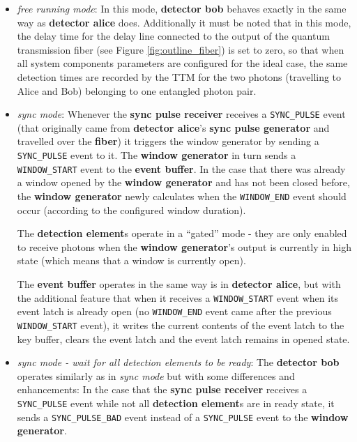 \begin{itemize}

\item \textit{free running mode}: In this mode, \textbf{detector bob} behaves exactly in the same way as \textbf{detector alice} does. Additionally it must be noted that in this mode, the delay time for the delay line connected to the output of the quantum transmission fiber (see Figure \ref{fig:outline_fiber}) is set to zero, so that when all system components parameters are configured for the ideal case, the same detection times are recorded by the TTM for the two photons (travelling to Alice and Bob) belonging to one entangled photon pair.

\item \textit{sync mode}: Whenever the \textbf{sync pulse receiver} receives a \texttt{SYNC\_PULSE} event (that originally came from \textbf{detector alice}'s \textbf{sync pulse generator} and travelled over the \textbf{fiber}) it triggers the window generator by sending a \texttt{SYNC\_PULSE} event to it. The \textbf{window generator} in turn sends a \texttt{WINDOW\_START} event to the \textbf{event buffer}. In the case that there was already a window opened by the \textbf{window generator} and has not been closed before, the \textbf{window generator} newly calculates when the \texttt{WINDOW\_END} event should occur (according to the configured window duration). 

The \textbf{detection element}s operate in a ``gated'' mode - they are only enabled to receive photons when the \textbf{window generator}'s output is currently in high state (which means that a window is currently open).

The \textbf{event buffer} operates in the same way is in \textbf{detector alice}, but with the additional feature that when it receives a \texttt{WINDOW\_START} event when its event latch is already open (no \texttt{WINDOW\_END} event came after the previous \texttt{WINDOW\_START} event), it writes the current contents of the event latch to the key buffer, clears the event latch and the event latch remains in opened state.

\item \textit{sync mode - wait for all detection elements to be ready}: The \textbf{detector bob} operates similarly as in \textit{sync mode} but with some differences and enhancements: In the case that the \textbf{sync pulse receiver} receives a \texttt{SYNC\_PULSE} event while not all \textbf{detection element}s are in ready state, it sends a \texttt{SYNC\_PULSE\_BAD} event instead of a \texttt{SYNC\_PULSE} event to the \textbf{window generator}. 


\end{itemize}

